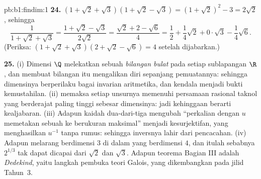 \begin{solution}{pb:b1:findim:1}
\textbf{24.} $(1 + \sqrt2 + \sqrt3)(1 + \sqrt2 - \sqrt3) = (1 +
\sqrt2)^2 - 3 = 2\sqrt2$, sehingga
\[
\frac1{1 + \sqrt2 + \sqrt3}
= \frac{1 + \sqrt2 - \sqrt3}{2\sqrt2}
= \frac{\sqrt2 + 2 - \sqrt6}{4}
= \frac12 + \frac14\sqrt2 + 0\cdot\sqrt3 - \frac14\sqrt6 .
\]
(Periksa: $(1 + \sqrt2 + \sqrt3)(2 + \sqrt2 - \sqrt6) = 4$ setelah
dijabarkan.)

\textbf{25.} (i) Dimensi $\Q$ melekatkan sebuah \emph{bilangan bulat} pada
setiap sublapangan $\R$, dan  membuat bilangan itu
mengalikan diri sepanjang pemuatannya: sehingga dimensinya berperilaku bagai
invarian aritmetika, dan kendala  menjadi bukti
kemustahilan. (ii)  memaksa setiap unsurnya memenuhi
persamaan  rasional taknol yang berderajat paling tinggi sebesar
dimensinya: jadi kehinggaan berarti kealjabaran. (iii) Adapun
kaidah dua-dari-tiga mengubah ``perkalian dengan $u$ memetakan sebuah 
ke  berukuran maksimal'' menjadi kesurjektifan, yang menghasilkan
$u^{-1}$ tanpa rumus: sehingga inversnya lahir dari pencacahan. (iv) Adapun
 melarang  berdimensi $3$ di dalam yang
berdimensi $4$, dan itulah sebabnya $2^{1/3}$ tak dapat dicapai
dari $\sqrt2$ dan $\sqrt3$. Adapun teorema Bagian III adalah
\emph{ Dedekind}, yaitu langkah pembuka teori Galois,
yang dikembangkan pada jilid Tahun~3.

\end{solution}
